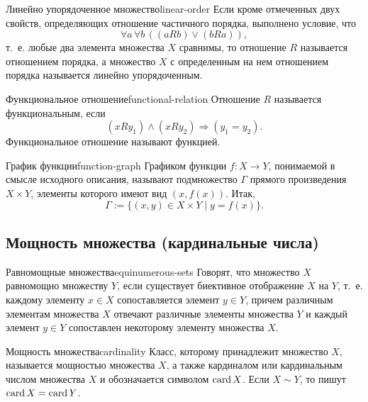 \begin{definition}{Линейно упорядоченное множество}{linear-order}
  Если кроме отмеченных двух свойств, определяющих отношение частичного
  порядка, выполнено условие, что
  \[
    \forall a\,\forall b\,((aRb)\lor(bRa)),
  \]
  т.~е. любые два элемента множества $X$ сравнимы, то отношение $R$
  называется отношением порядка, а множество $X$ с определенным на нем
  отношением порядка называется линейно упорядоченным.
\end{definition}

\begin{definition}{Функциональное отношение}{functional-relation}
  Отношение $R$ называется функциональным, если
  \[
    (xRy_1)\land(xRy_2)\Rightarrow(y_1=y_2).
  \]
  Функциональное отношение называют функцией.
\end{definition}

\begin{definition}{График функции}{function-graph}
  Графиком функции $f:X\to Y$, понимаемой в смысле исходного описания,
  называют подмножество $\Gamma$ прямого произведения $X\times Y$, элементы
  которого имеют вид $(x,f(x))$. Итак,
  \[
    \Gamma:=\{(x,y)\in X\times Y\mid y=f(x)\}.
  \]
\end{definition}


\subsection{Мощность множества (кардинальные числа)}

\begin{definition}{Равномощные множества}{equinumerous-sets}
  Говорят, что множество $X$ равномощно множеству $Y$, если существует
  биективное отображение $X$ на $Y$, т.~е. каждому элементу $x\in X$
  сопоставляется элемент $y\in Y$, причем различным элементам множества $X$
  отвечают различные элементы множества $Y$ и каждый элемент $y\in Y$
  сопоставлен некоторому элементу множества $X$.
\end{definition}

\begin{definition}{Мощность множества}{cardinality}
  Класс, которому принадлежит множество $X$, называется мощностью множества
  $X$, а также кардиналом или кардинальным числом множества $X$ и
  обозначается символом $\operatorname{card} X$. Если $X\sim Y$, то пишут
  $\operatorname{card} X=\operatorname{card} Y$.
\end{definition}

